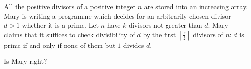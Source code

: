 All the positive divisors of a positive integer $n$ are stored into an increasing array. Mary is writing a programme which decides for an arbitrarily chosen divisor $d > 1$ whether it is a prime. Let $n$ have $k$ divisors not greater than $d$. Mary claims that it suffices to check divisibility of $d$ by the first $\left\lceil\frac{k}{2}\right\rceil$ divisors of $n$: $d$ is prime if and only if none of them but $1$ divides $d$.

Is Mary right?